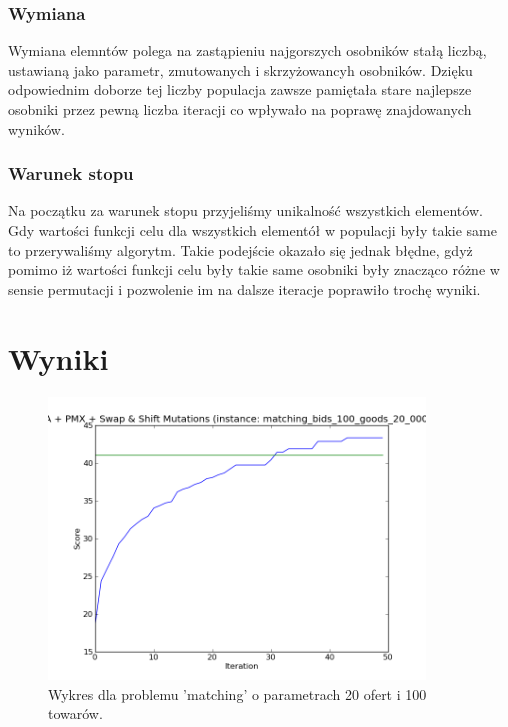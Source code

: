 \subsubsection{Wymiana}
Wymiana elemntów polega na zastąpieniu najgorszych osobników stałą liczbą, ustawianą jako parametr, zmutowanych i skrzyżowancyh osobników.
Dzięku odpowiednim doborze tej liczby populacja zawsze pamiętała stare najlepsze osobniki przez pewną liczba iteracji co wpływało na poprawę znajdowanych wyników.

\subsubsection{Warunek stopu}
Na początku za warunek stopu przyjeliśmy unikalność wszystkich elementów.
Gdy wartości funkcji celu dla wszystkich elementół w populacji były takie same to przerywaliśmy algorytm.
Takie podejście okazało się jednak błędne, gdyż pomimo iż wartości funkcji celu były takie same osobniki były znacząco różne w sensie permutacji i pozwolenie im na dalsze iteracje poprawiło trochę wyniki.

\section{Wyniki}
\begin{figure}[ht!]
    \centering
    \includegraphics[width=10cm]{wykresy/matching_bids_100_goods_20_0000_txt_1.png}
    \caption{Wykres dla problemu 'matching' o parametrach 20 ofert i 100 towarów.}
\end{figure}

